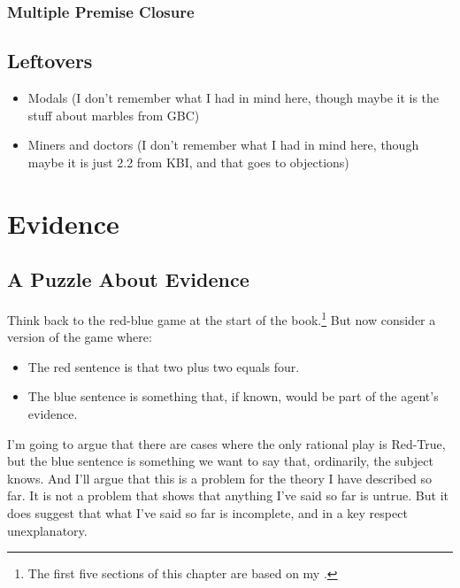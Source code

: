 \documentclass[11pt,]{book}
\providecommand{\tightlist}{%
  \setlength{\itemsep}{0pt}\setlength{\parskip}{0pt}}
\let\rmarkdownfootnote\footnote%
\def\footnote{\protect\rmarkdownfootnote}
\begin{document}
\hypertarget{andintro}{%
\subsection{Multiple Premise Closure}\label{andintro}}

\hypertarget{leftovers}{%
\section{Leftovers}\label{leftovers}}

\begin{itemize}
\tightlist
\item
  Modals (I don't remember what I had in mind here, though maybe it is the stuff about marbles from GBC)
\item
  Miners and doctors (I don't remember what I had in mind here, though maybe it is just 2.2 from KBI, and that goes to objections)
\end{itemize}

\hypertarget{evidence}{%
\chapter{Evidence}\label{evidence}}

\hypertarget{evpuzzle}{%
\section{A Puzzle About Evidence}\label{evpuzzle}}

Think back to the red-blue game at the start of the book.\footnote{The first five sections of this chapter are based on my \citeyearpar{Weatherson2018-WEAIEA-2}.} But now consider a version of the game where:

\begin{itemize}
\tightlist
\item
  The red sentence is that two plus two equals four.
\item
  The blue sentence is something that, if known, would be part of the
  agent's evidence.
\end{itemize}

I'm going to argue that there are cases where the only rational play is Red-True, but the blue sentence is something we want to say that, ordinarily, the subject knows. And I'll argue that this is a problem for the theory I have described so far. It is not a problem that shows that anything I've said so far is untrue. But it does suggest that what I've said so far is incomplete, and in a key respect unexplanatory.
\end{document}
